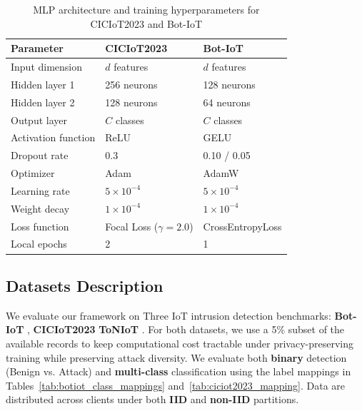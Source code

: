 \documentclass[journal,twoside,web]{ieeecolor}
\begin{document}
\begin{table}[t]
\centering
\caption{MLP architecture and training hyperparameters for CICIoT2023 and Bot-IoT}
\label{tab:mlp_hyperparams}

\renewcommand{\arraystretch}{1.15}

\begin{tabularx}{\linewidth}{|X|X|X|}
\hline
\textbf{Parameter} & \textbf{CICIoT2023} & \textbf{Bot-IoT} \\
\hline

Input dimension & $d$ features & $d$ features \\
\hline

Hidden layer 1 & 256 neurons & 128 neurons \\
\hline

Hidden layer 2 & 128 neurons & 64 neurons \\
\hline

Output layer & $C$ classes & $C$ classes \\
\hline

Activation function & ReLU & GELU \\
\hline

Dropout rate & 0.3 & 0.10 / 0.05 \\
\hline

Optimizer & Adam & AdamW \\
\hline

Learning rate & $5 \times 10^{-4}$ & $5 \times 10^{-4}$ \\
\hline

Weight decay & $1 \times 10^{-4}$ & $1 \times 10^{-4}$ \\
\hline

Loss function & Focal Loss ($\gamma = 2.0$) & CrossEntropyLoss  \\
\hline

Local epochs & 2 & 1 \\
\hline

\end{tabularx}

\end{table}


\subsection{Datasets Description}
\label{sec:dataset}

We evaluate our framework on Three IoT intrusion detection benchmarks: \textbf{Bot-IoT} \cite{moustafa2019botiot}, \textbf{CICIoT2023} \cite{ciciot2023dataset} \textbf{ToNIoT} \cite{toniot}. For both datasets, we use a 5\% subset of the available records to keep computational cost tractable under privacy-preserving training while preserving attack diversity. We evaluate both \textbf{binary} detection (Benign vs. Attack) and \textbf{multi-class} classification using the label mappings in Tables~\ref{tab:botiot_class_mappings} and~\ref{tab:ciciot2023_mapping}. Data are distributed across clients under both \textbf{IID} and \textbf{non-IID} partitions.
\end{document}
